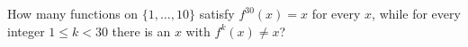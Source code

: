 How many functions on $\{1,\ldots,10\}$ satisfy $f^{30}(x)=x$ for every $x$, while for every integer $1\le k<30$ there is an $x$ with $f^k(x)\ne x$?
